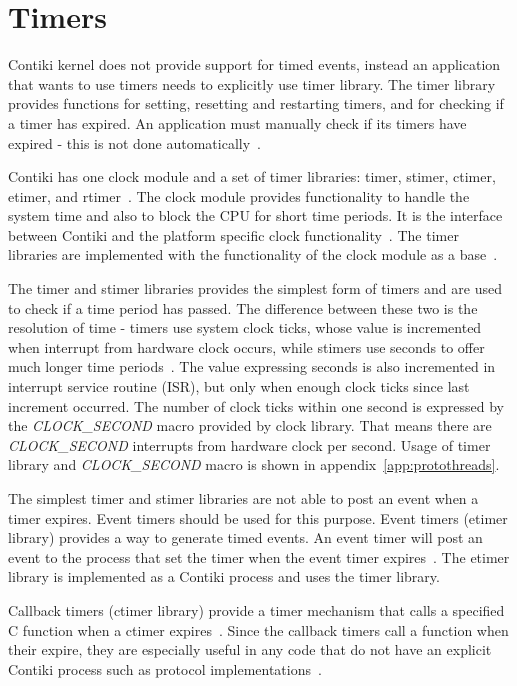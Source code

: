 
\section{Timers}\label{sec:contiki-timers}
Contiki kernel does not provide support for timed events,
instead an application that wants to use timers needs to explicitly use timer library.
The timer library provides functions for setting, resetting and restarting timers,
and for checking if a timer has expired.
An application must manually check if its timers have expired - this is not done automatically~\cite{contiki-docs}.

Contiki has one clock module and a set of timer libraries: timer, stimer, ctimer, etimer, and rtimer~\cite{contiki-wiki-timers}.
The clock module provides functionality to handle the system time and also to block the CPU for short time periods.
It is the interface between Contiki and the platform specific clock functionality~\cite{contiki-docs}.
The timer libraries are implemented with the functionality of the clock module as a base~\cite{contiki-wiki-timers}.

The timer and stimer libraries provides the simplest form of timers and are used to check if a time period has passed.
The difference between these two is the resolution of time -
timers use system clock ticks, whose value is incremented when interrupt from hardware clock occurs,
while stimers use seconds to offer much longer time periods~\cite{contiki-wiki-timers}.
The value expressing seconds is also incremented in interrupt service routine (ISR),
but only when enough clock ticks since last increment occurred.
The number of clock ticks within one second is expressed by the
{\it{CLOCK\_SECOND}} macro provided by clock library.
That means there are {\it{CLOCK\_SECOND}} interrupts from hardware clock per second.
Usage of timer library and {\it{CLOCK\_SECOND}} macro is shown in appendix~\ref{app:protothreads}.

The simplest timer and stimer libraries are not able to post an event when a timer expires.
Event timers should be used for this purpose.
Event timers (etimer library) provides a way to generate timed events.
An event timer will post an event to the process that set the timer when the
event timer expires~\cite{contiki-docs}.
The etimer library is implemented as a Contiki process and uses the timer library.

Callback timers (ctimer library) provide a timer mechanism that calls a specified
C function when a ctimer expires~\cite{contiki-docs}.
Since the callback timers call a function when their expire,
they are especially useful in any code that do not have an
explicit Contiki process such as protocol implementations~\cite{contiki-wiki-timers}.

